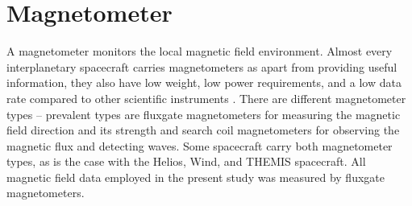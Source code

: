 \section{Magnetometer}
\label{sec:magnetometer}
A magnetometer monitors the local magnetic field environment. Almost every interplanetary spacecraft carries magnetometers as apart from providing useful information, they also have low weight, low power requirements, and a low data rate compared to other scientific instruments \citep{Ness1970}. There are different magnetometer types -- prevalent types are fluxgate magnetometers for measuring the magnetic field direction and its strength and search coil magnetometers for observing the magnetic flux and detecting waves. Some spacecraft carry both magnetometer types, as is the case with the Helios, Wind, and THEMIS spacecraft. All magnetic field data employed in the present study was measured by fluxgate magnetometers.

